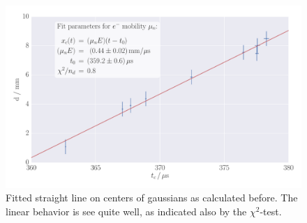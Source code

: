 \begin{figure}
    \includegraphics[width=1.0\textwidth]{figures/haynes_shockley_mu_e}
    \caption{
        Fitted straight line on centers of gaussians as calculated before. 
        The linear behavior is see quite well, as indicated also by the 
        $\chi^2$-test.
        }
    \label{fig:h_s_mu_e}
\end{figure}

